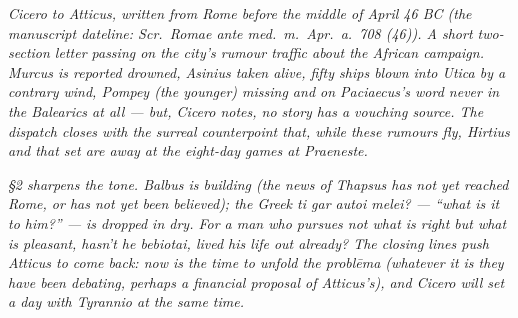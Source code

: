 
\textit{Cicero to Atticus, written from Rome before
the middle of April 46 BC (the manuscript dateline:
\textit{Scr.\ Romae ante med.\ m.\ Apr.\ a.\ 708 (46)}).
A short two-section letter passing on the city's rumour
traffic about the African campaign. Murcus is reported
drowned, Asinius taken alive, fifty ships blown into
Utica by a contrary wind, Pompey (the younger) missing
and on Paciaecus's word never in the Balearics at all
--- but, Cicero notes, no story has a vouching source.
The dispatch closes with the surreal counterpoint that,
while these rumours fly, Hirtius and that set are away
at the eight-day games at Praeneste.}

\textit{\S2 sharpens the tone. Balbus is building (the
news of Thapsus has not yet reached Rome, or has not
yet been believed); the Greek \textit{ti gar autoi melei?}
--- ``what is it to him?'' --- is dropped in dry. For
a man who pursues not what is right but what is pleasant,
hasn't he \textit{bebiotai}, lived his life out already?
The closing lines push Atticus to come back: now is the
time to unfold the \textit{probl\=ema} (whatever it is
they have been debating, perhaps a financial proposal of
Atticus's), and Cicero will set a day with Tyrannio at
the same time.}
